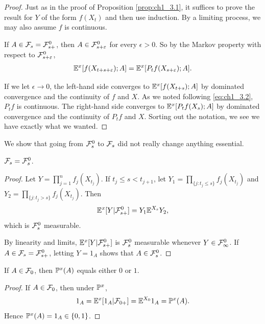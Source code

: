 \begin{proof}
Just as in the proof of Proposition \ref{prop:ch1_3.1}, it suffices to prove the result for $Y$ of the form $f(X_t)$ and then use induction. By a limiting process, we may also assume $f$ is continuous.

If $A \in \FC_s = \FC_{s+}^0$, then $A \in \FC_{s+\epsilon}^0$ for every $\epsilon > 0$. So by the Markov property with respect to $\FC_{s+\epsilon}^0$,
\mpagebreak
\begin{align*}
    \E^x[f(X_{t+s+\epsilon});A] = \E^x[P_tf(X_{s+\epsilon});A].
\end{align*}

If we let $\epsilon \to 0$, the left-hand side converges to $\E^x[f(X_{t+s});A]$ by dominated convergence and the continuity of $f$ and $X$. As we noted following \eqref{eq:ch1_3.2}, $P_tf$ is continuous. The right-hand side converges to $\E^x[P_tf(X_s);A]$ by dominated convergence and the continuity of $P_tf$ and $X$. Sorting out the notation, we see we have exactly what we wanted.
\end{proof}


We show that going from $\FC_s^0$ to $\FC_s$ did not really change anything essential.

\begin{proposition}\label{prop:ch1_3.5}
$\FC_s = \FC_s^0$.
\end{proposition}

\begin{proof}
Let $Y = \prod_{j=1}^n f_j(X_{t_j})$. If $t_j \leq s < t_{j+1}$, let $Y_1 = \prod_{\{j:t_j \leq s\}} f_j(X_{t_j})$ and $Y_2 = \prod_{\{j:t_j>s\}} f_j(X_{t_j})$. Then
\[
    \E^x[Y\mid \FC_{s+}^0] = Y_1\E^{X_s}Y_2,
\]
which is $\FC_s^0$ measurable.

By linearity and limits, $\E^x[Y\mid \FC_{s+}^0]$ is $\FC_s^0$ measurable whenever $Y \in \FC_\infty^0$. If $A \in \FC_s = \FC_{s+}^0$, letting $Y = 1_A$ shows that $A \in \FC_s^0$.
\end{proof}

\begin{corollary}\label{cor:ch1_3.6}
If $A \in \FC_0$, then $\P^x(A)$ equals either $0$ or $1$.
\end{corollary}

\begin{proof}
If $A \in \FC_0$, then under $\P^x$,
\[
    1_A = \E^x[1_A\mid \FC_{0+}] = \E^{X_0}1_A = \P^x(A).
\]
Hence $\P^x(A) = 1_A \in \{0,1\}$.
\end{proof}

